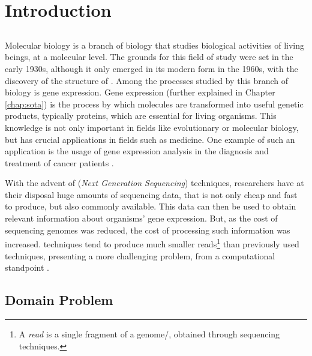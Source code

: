\chapter{Introduction} \label{chap:intro}

\section*{}


Molecular biology is a branch of biology that studies biological activities of
living beings, at a molecular level. The grounds for this field of study were
set in the early 1930s, although it only emerged in its modern form in the
1960s, with the discovery of the structure of \dna. Among the processes studied
by this branch of biology is gene expression. Gene expression (further explained
in Chapter \ref{chap:sota}) is the process by which \dna{} molecules are
transformed into useful genetic products, typically proteins, which are
essential for living organisms. This knowledge is not only important in fields
like evolutionary or molecular biology, but has crucial applications in fields
such as medicine. One example of such an application is the usage of gene
expression analysis in the diagnosis and treatment of cancer patients
\cite{Pusztai01062003}.

With the advent of \ngs{} (\textit{Next Generation Sequencing}) techniques,
researchers have at their disposal huge amounts of sequencing data, that is not
only cheap and fast to produce, but also commonly available. This data can then
be used to obtain relevant information about organisms' gene expression. But, as
the cost of sequencing genomes was reduced, the cost of processing such
information was increased. \ngs{} techniques tend to produce much smaller
reads\footnote{A \textit{read} is a single fragment of a genome/\trans, obtained
through sequencing techniques.} than previously used techniques, presenting a
more challenging problem, from a computational standpoint \cite{Wolf2013}.

\section{Domain Problem} \label{sec:problem}


